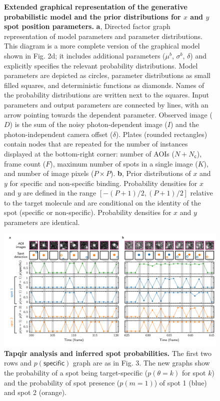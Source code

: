 \begin{figure} [t]
\caption{\textbf{Extended graphical representation of the generative probabilistic model and the prior distributions for $x$ and $y$ spot position parameters.} \textbf{a}, Directed factor graph representation \cite{Bishop2006-oa} of model parameters and parameter distributions. This diagram is a more complete version of the graphical model shown in Fig. 2d; it includes additional parameters ($\mu^b$, $\sigma^b$, $\delta$) and explicitly specifies the relevant probability distributions.  Model parameters are depicted as circles, parameter distributions as small filled squares, and deterministic functions as diamonds. Names of the probability distributions are written next to the squares. Input parameters and output parameters are connected by lines, with an arrow pointing towards the dependent parameter. Observed image ($D$) is the sum of the noisy photon-dependent image ($I$) and the photon-independent camera offset ($\delta$). Plates (rounded rectangles) contain nodes that are repeated for the number of instances displayed at the bottom-right corner: number of AOIs ($N+N_\mathsf{c}$), frame count ($F$), maximum number of spots in a single image ($K$), and number of image pixels ($P \times P$). \textbf{b}, Prior distributions of $x$ and $y$ for specific and non-specific binding. Probability densities for $x$ and $y$ are defined in the range $\left[ -(P+1)/2, (P+1)/2 \right] $ relative to the target molecule and are conditional on the identity of the spot (specific or non-specific).  Probability densities for $x$ and $y$ parameters are identical. }
\end{figure}
\clearpage

\begin{figure}[h]
\centering
\includegraphics[width=\textwidth]{extended-data/figure2.png}
\caption{\textbf{Tapqir analysis and inferred spot probabilities.} The first two rows and $p(\mathsf{specific})$ graph are as in Fig. 3. The new graphs show the probability of a spot being target-specific ($p(\theta=k)$ for spot $k$) and the probability of spot presence ($p(m=1)$) of spot 1 (blue) and spot 2 (orange).  }
\end{figure}
\pagebreak

